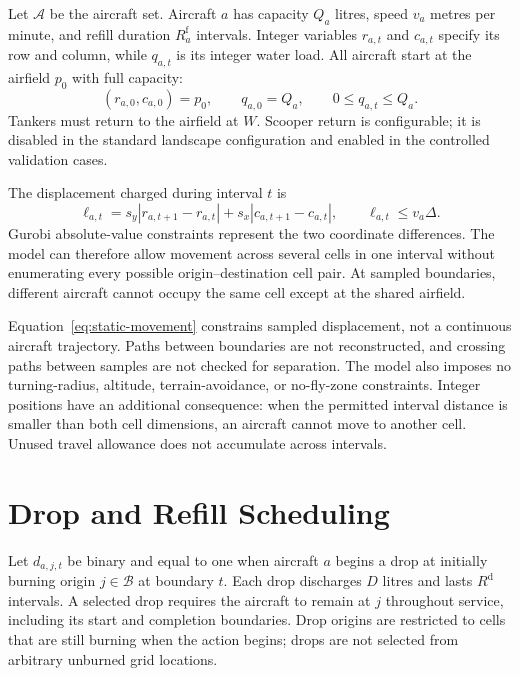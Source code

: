 Let $\mathcal{A}$ be the aircraft set. Aircraft $a$ has capacity $Q_a$ litres, speed $v_a$ metres per minute, and refill duration $R_a^{\mathrm{f}}$ intervals. Integer variables $r_{a,t}$ and $c_{a,t}$ specify its row and column, while $q_{a,t}$ is its integer water load. All aircraft start at the airfield $p_0$ with full capacity:
\begin{equation}
    (r_{a,0},c_{a,0})=p_0,
    \qquad q_{a,0}=Q_a,
    \qquad 0\leq q_{a,t}\leq Q_a.
\end{equation}
Tankers must return to the airfield at $W$. Scooper return is configurable; it is disabled in the standard landscape configuration and enabled in the controlled validation cases.

The displacement charged during interval $t$ is
\begin{equation}
    \ell_{a,t}
    =s_y|r_{a,t+1}-r_{a,t}|
    +s_x|c_{a,t+1}-c_{a,t}|,
    \qquad \ell_{a,t}\leq v_a\Delta.
    \label{eq:static-movement}
\end{equation}
Gurobi absolute-value constraints represent the two coordinate differences. The model can therefore allow movement across several cells in one interval without enumerating every possible origin--destination cell pair. At sampled boundaries, different aircraft cannot occupy the same cell except at the shared airfield.

Equation~\eqref{eq:static-movement} constrains sampled displacement, not a continuous aircraft trajectory. Paths between boundaries are not reconstructed, and crossing paths between samples are not checked for separation. The model also imposes no turning-radius, altitude, terrain-avoidance, or no-fly-zone constraints. Integer positions have an additional consequence: when the permitted interval distance is smaller than both cell dimensions, an aircraft cannot move to another cell. Unused travel allowance does not accumulate across intervals.

\section{Drop and Refill Scheduling}
\label{sec:method-actions}

Let $d_{a,j,t}$ be binary and equal to one when aircraft $a$ begins a drop at initially burning origin $j\in\mathcal{B}$ at boundary $t$. Each drop discharges $D$ litres and lasts $R^{\mathrm{d}}$ intervals. A selected drop requires the aircraft to remain at $j$ throughout service, including its start and completion boundaries. Drop origins are restricted to cells that are still burning when the action begins; drops are not selected from arbitrary unburned grid locations.

